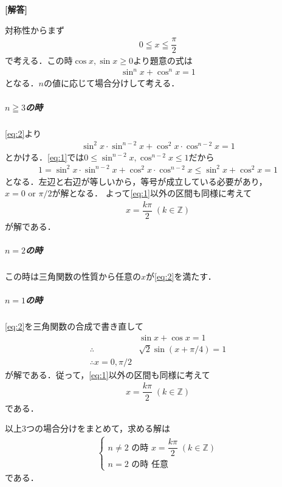 \documentclass[../../main.tex]{subfiles}
\begin{document}
\begin{oframed}
  
\end{oframed}

{\bf [解答]}

対称性からまず
\begin{align}
  0 \leqq x \leqq \dfrac{\pi}{2} \label{eq:1}
\end{align}
で考える．この時$\cos x, \sin x\ge 0$より題意の式は
\begin{align}
  \sin^n x + \cos^n x = 1 \label{eq:2}
\end{align}
となる．$n$の値に応じて場合分けして考える．

\subparagraph{$n \geqq 3$の時}

\cref{eq:2}より
\begin{align}
  \sin^2 x \cdot \sin^{n-2} x + \cos^2 x \cdot \cos^{n-2} x = 1
\end{align}
とかける．\cref{eq:1}では$0 \le \sin^{n-2} x, \cos^{n-2} x \le 1$だから
\begin{align}
  1 = \sin^2 x \cdot \sin^{n-2} x + \cos^2 x \cdot \cos^{n-2} x \le \sin^2 x + \cos^2 x = 1
\end{align}
となる．左辺と右辺が等しいから，等号が成立している必要があり，$x = 0 \text{ or } \pi/2$が解となる．
よって\cref{eq:1}以外の区間も同様に考えて
\begin{align}
  x = \dfrac{k\pi}{2} \; (k \in \mathbb{Z}) \label{eq:3}
\end{align}
が解である．

\subparagraph{$n=2$の時}
この時は三角関数の性質から任意の$x$が\cref{eq:2}を満たす．

\subparagraph{$n=1$の時}
\cref{eq:2}を三角関数の合成で書き直して
\begin{align}
  & \sin x + \cos x = 1 \\
  \therefore
  & \sqrt{2}\sin(x+\pi/4) = 1 \\
  \therefore
  x = 0, \pi/2
\end{align}
が解である．従って，\cref{eq:1}以外の区間も同様に考えて
\begin{align}
  x = \dfrac{k\pi}{2} \; (k \in \mathbb{Z}) \label{eq:4}
\end{align}
である．
\casesend

以上$3$つの場合分けをまとめて，求める解は
\begin{align}
  \begin{cases}
    n \neq 2 \text{ の時 } x = \dfrac{k\pi}{2} \; (k \in \mathbb{Z}) \\
    n = 2 \text{ の時 } \text{任意}
  \end{cases}
\end{align}
である．
\end{document}
